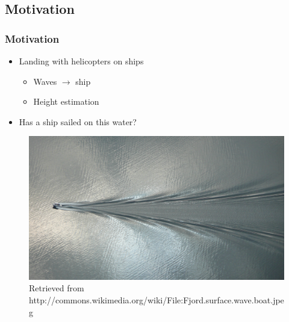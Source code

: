 \subsection{Motivation}

\begin{frame}[<+(1)->]
\frametitle{Motivation}

\begin{itemize}
\item Landing with helicopters on ships
\begin{itemize}
    \item Waves $\rightarrow$ ship
    \item Height estimation
\end{itemize}
\item Has a ship sailed on this water?
\end{itemize}

\begin{figure}
\centering
\includegraphics[width=.7\textwidth]{Images/Attribute/Wake/Fjord_surface_wave_boat}
\caption{Retrieved from http://commons.wikimedia.org/wiki/File:Fjord.surface.wave.boat.jpeg}
\end{figure}

\end{frame}
